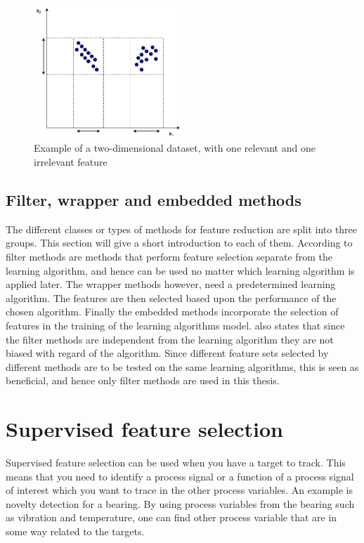     \begin{figure}
        \centering
        \includegraphics[width=0.5\textwidth]{report/figures/techniques/feature_selection.pdf}
        \caption{Example of a two-dimensional dataset, with one relevant and one irrelevant feature}
        \label{fig:feature_selection}
    \end{figure}
    
    
    
    \subsection{Filter, wrapper and embedded methods}\label{subsec:filter_wrapper_embedded}
    The different classes or types of methods for feature reduction are split into three groups. This section will give a short introduction to each of them.
    According to \cite{Liu2010} filter methods are methods that perform feature selection separate from the learning algorithm, and hence can be used no matter which learning algorithm is applied later. The wrapper methods however, need a predetermined learning algorithm. The features are then selected based upon the performance of the chosen algorithm.  Finally the embedded methods incorporate the selection of features in the training of the learning algorithms model.
    \cite{Liu2010} also states that since the filter methods are independent from the learning algorithm they are not biased with regard of the algorithm. Since different feature sets selected by different methods are to be tested on the same learning algorithms, this is seen as beneficial, and hence only filter methods are used in this thesis. 

\section{Supervised feature selection}\label{sec:sup_feat_select}
    Supervised feature selection can be used when you have a target to track. This means that you need to identify a process signal or a function of a process signal of interest which you want to trace in the other process variables. An example is novelty detection for a bearing. By using process variables from the bearing such as vibration and temperature, one can find other process variable that are in some way related to the targets. 
    
